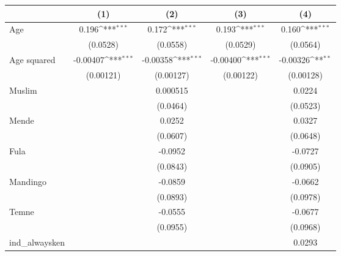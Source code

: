 {
\def\sym#1{\ifmmode^{#1}\else\(^{#1}\)\fi}
\begin{tabular}{l*{4}{c}}
\hline\hline
                    &\multicolumn{1}{c}{(1)}         &\multicolumn{1}{c}{(2)}         &\multicolumn{1}{c}{(3)}         &\multicolumn{1}{c}{(4)}         \\
\hline
Age                 &       0.196\sym{***}&       0.172\sym{***}&       0.193\sym{***}&       0.160\sym{***}\\
                    &    (0.0528)         &    (0.0558)         &    (0.0529)         &    (0.0564)         \\
[1em]
Age squared         &    -0.00407\sym{***}&    -0.00358\sym{***}&    -0.00400\sym{***}&    -0.00326\sym{**} \\
                    &   (0.00121)         &   (0.00127)         &   (0.00122)         &   (0.00128)         \\
[1em]
Muslim              &                     &    0.000515         &                     &      0.0224         \\
                    &                     &    (0.0464)         &                     &    (0.0523)         \\
[1em]
Mende               &                     &      0.0252         &                     &      0.0327         \\
                    &                     &    (0.0607)         &                     &    (0.0648)         \\
[1em]
Fula                &                     &     -0.0952         &                     &     -0.0727         \\
                    &                     &    (0.0843)         &                     &    (0.0905)         \\
[1em]
Mandingo            &                     &     -0.0859         &                     &     -0.0662         \\
                    &                     &    (0.0893)         &                     &    (0.0978)         \\
[1em]
Temne               &                     &     -0.0555         &                     &     -0.0677         \\
                    &                     &    (0.0955)         &                     &    (0.0968)         \\
[1em]
ind\_alwaysken       &                     &                     &                     &      0.0293         \\

\end{tabular}}
